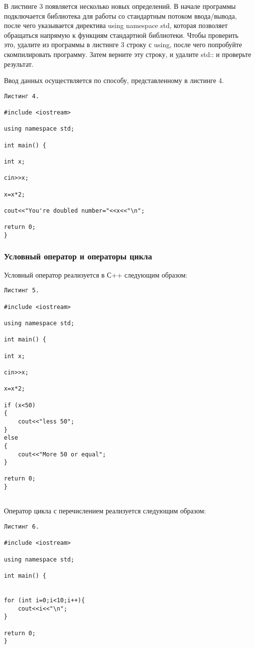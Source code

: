 \documentclass[a4paper,report,14pt]{ncc}
\begin{document}
В листинге 3 появляется несколько новых определений. В начале программы подключается библиотека для работы со стандартным потоком ввода/вывода, после чего указывается директива using namespace std, которая позволяет обращаться напрямую к функциям стандартной библиотеки. Чтобы проверить это, удалите из программы в листинге 3 строку с using, после чего попробуйте скомпилировать программу. Затем верните эту строку, и удалите std:: и проверьте результат.

Ввод данных осуществляется по способу, представленному в листинге 4.

\begin{verbatim}
Листинг 4.

#include <iostream>

using namespace std;

int main() {

int x;

cin>>x;

x=x*2;

cout<<"You're doubled number="<<x<<"\n";

return 0;
}

\end{verbatim}



\subsubsection{Условный оператор и операторы цикла}

Условный оператор реализуется в С++ следующим образом:
\begin{verbatim}
Листинг 5.

#include <iostream>

using namespace std;

int main() {

int x;

cin>>x;

x=x*2;

if (x<50)
{
	cout<<"less 50";
}
else
{
	cout<<"More 50 or equal";
}

return 0;
}


\end{verbatim}

Оператор цикла с перечислением реализуется следующим образом:

\begin{verbatim}
Листинг 6.

#include <iostream>

using namespace std;

int main() {


for (int i=0;i<10;i++){
	cout<<i<<"\n";
}

return 0;
}

\end{verbatim}
\end{document}
